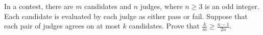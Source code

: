 In a contest, there are $m$ candidates and $n$ judges, where $n \geq 3$ is an odd integer. Each candidate is evaluated by each judge as either pass or fail. Suppose that each pair of judges agrees on at most $k$ candidates. Prove that $\frac{k}{m} \geq \frac{n-1}{2n}$.
